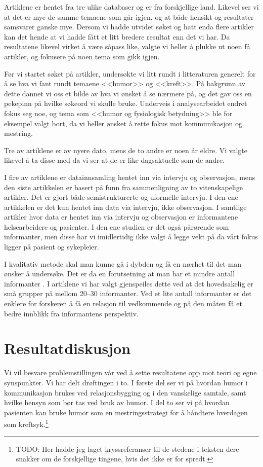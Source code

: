 Artiklene er hentet fra tre ulike databaser og er fra forskjellige land.
Likevel ser vi at det er mye de samme temaene som går igjen, og at både hensikt
og resultater samsvarer ganske mye. Dersom vi hadde utvidet søket og hatt enda
flere artikler kan det hende at vi hadde fått et litt bredere resultat enn det
vi har. Da resultatene likevel virket å være såpass like, valgte vi heller å
plukke ut noen få artikler, og fokusere på noen tema som gikk igjen.

Før vi startet søket på artikler, undersøkte vi litt rundt i litteraturen
generelt for å se hva vi fant rundt temaene <<humor>> og <<kreft>>. På bakgrunn
av dette dannet vi oss et bilde av hva vi ønsket å se nærmere på, og det gav
oss en pekepinn på hvilke søkeord vi skulle bruke. Underveis i analysearbeidet
endret fokus seg noe, og tema som <<humor og fysiologisk betydning>> ble for
eksempel valgt bort, da vi heller ønsket å rette fokus mot kommunikasjon og
mestring.

Tre av artiklene er av nyere dato, mens de to andre er noen år eldre. Vi valgte
likevel å ta disse med da vi ser at de er like dagsaktuelle som de andre.

I fire av artiklene er datainnsamling hentet inn via intervju og observasjon,
mens den siste artikkelen er basert på funn fra sammenligning av to
vitenskapelige artikler. Det er gjort både semistrukturerte og uformelle
intervju. I den ene artikkelen er det kun hentet inn data via intervju, ikke
observasjon. I samtlige artikler hvor data er hentet inn via intervju og
observasjon er informantene helsearbeidere og pasienter. I den ene studien er
det også pårørende som informanter, men disse har vi imidlertidig ikke valgt å
legge vekt på da vårt fokus ligger på pasient og sykepleier.

I kvalitativ metode skal man kunne gå i dybden og få en nærhet til det man
ønsker å undersøke. Det er da en forutsetning at man har et mindre antall
informanter \cite{olsson2003}. I artiklene vi har valgt gjenspeiles dette ved
at  det hovedsakelig er små grupper på mellom 20--30 informanter.  Ved et lite
antall informanter er det enklere for forskeren å få en relasjon til
vedkommende og på den måten få et bedre innblikk fra informantens perspektiv.

\section{Resultatdiskusjon}

Vi vil besvare problemstillingen vår ved å sette resultatene opp mot teori og
egne synspunkter. Vi har delt drøftingen i to. I første del ser vi på hvordan
humor i kommunikasjon brukes ved relasjonsbygging og i den vanskelige samtale,
samt hvilke hensyn som bør tas ved bruk av humor. I del to ser vi på hvordan
pasienten kan bruke humor som en mestringsstrategi for å håndtere hverdagen som
kreftsyk.\footnote{TODO: Her hadde jeg laget kryssreferanser til de stedene i
teksten dere snakker om de forskjellige tingene, hvis det ikke er for spredt.}

